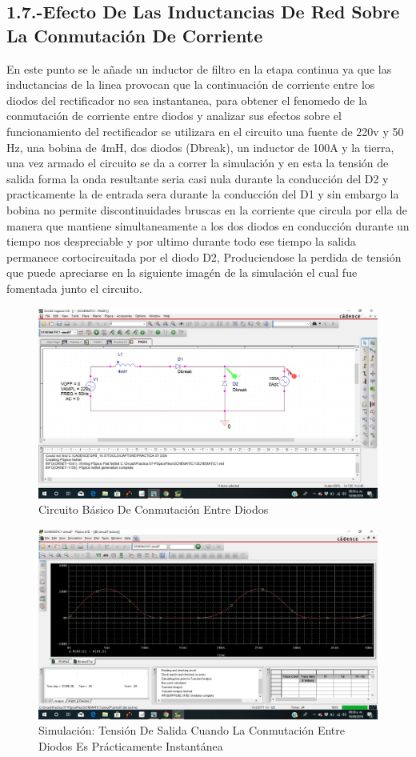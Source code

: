 \documentclass[10pt,a4paper]{article}
\begin{document}
\newpage
\subsection{1.7.-Efecto De Las Inductancias De Red Sobre La Conmutación De Corriente}
En este punto se le añade un inductor de filtro en la etapa continua ya que las inductancias de la linea provocan que la continuación de corriente entre los diodos del rectificador no sea instantanea, para obtener el fenomedo de la conmutación de corriente entre diodos y analizar sus efectos sobre el funcionamiento del rectificador se utilizara en el circuito una fuente de 220v y 50 Hz, una bobina de 4mH, dos diodos (Dbreak), un inductor de 100A y la tierra, una vez armado el circuito se da a correr la simulación y en esta la tensión de salida forma la onda resultante seria casi nula durante la conducción del D2 y practicamente la de entrada sera durante la conducción del D1 y sin embargo la bobina no permite discontinuidades bruscas en la corriente que circula por ella de manera que mantiene simultaneamente a los dos diodos en conducción durante un tiempo nos despreciable y por ultimo durante todo ese tiempo la salida permanece cortocircuitada por el diodo D2, Produciendose la perdida de tensión que puede apreciarse en la siguiente imagén de la simulación el cual fue fomentada junto el circuito.
\begin{figure}[hbtp]
\centering
\includegraphics[scale=0.3]{07.jpeg}
\caption{Circuito Básico De Conmutación Entre Diodos}
\end{figure}
\begin{figure}[hbtp]
\centering
\includegraphics[scale=0.3]{7.jpeg}
\caption{Simulación: Tensión De Salida Cuando La Conmutación Entre Diodos Es Prácticamente Instantánea}
\end{figure}
\end{document}
